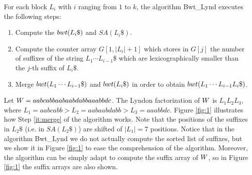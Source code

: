 \documentclass[envcountsame,runningheads]{llncs}
\begin{document}
For each block $L_i$ with $i$ ranging from $1$ to $k$, the algorithm {\sc Bwt\_Lynd} executes the following steps:
\begin{enumerate}
  \item\label{it:bwtSA} Compute the ${bwt}(L_{i}\$)$ and $SA(L_{i}\$)$.
  \item\label{it:a} Compute the counter array $G[1, |L_{i}|+1]$ which stores in $G[j]$ the number of suffixes of the string $L_1 \cdots L_{i-1}\$$ which are lexicographically smaller than the $j$-th suffix of $L_{i}\$$.
  \item\label{it:merge} Merge ${bwt}(L_1 \cdots L_{i-1}\$)$ and ${bwt}(L_{i}\$)$ in order to obtain ${bwt}(L_1 \cdots L_{i-1}L_{i}\$)$.
\end{enumerate}


\begin{example}\label{ex:merge}
Let $W = aabcabbaabaabdabbaaabbdc$.
The Lyndon factorization of $W$ is $L_1L_2L_3$, where $L_1=aabcabb>L_2=aabaabdabb>L_3=aaabbdc$.
Figure \ref{fig:1} illustrates how Step \ref{it:merge} of the algorithm works.
Note that the positions of the suffixes in $L_2\$$ (i.e. in $SA(L_2\$)$)  are shifted of $|L_1|=7$ positions.
Notice that in the algorithm {\sc Bwt\_Lynd} we do not actually compute the sorted list of suffixes, but we show it in Figure \ref{fig:1} to ease the comprehension of the algorithm. Moreover, the algorithm can be simply adapt to compute the suffix array of $W$, so in Figure \ref{fig:1} the suffix arrays are also shown.


\end{example}
\end{document}
